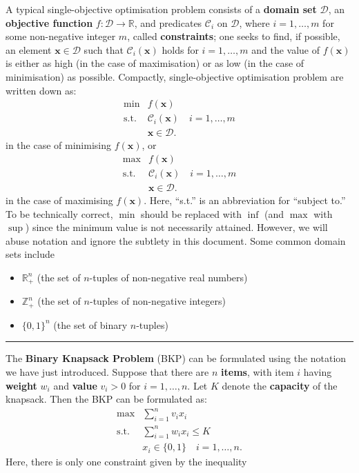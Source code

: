 A typical single-objective optimisation problem consists of a
\textbf{domain set} \(\mathcal{D}\), an \textbf{objective function}
\(f:\mathcal{D} \rightarrow \mathbb{R}\), and predicates
\(\mathcal{C}_i\) on \(\mathcal{D}\), where \(i = 1,\ldots,m\) for some
non-negative integer \(m\), called \textbf{constraints};  one seeks
to find, if possible, an element \(\mathbf{x} \in \mathcal{D}\) such
that \(\mathcal{C}_i(\mathbf{x})\) holds for \(i = 1,\ldots,m\) and the
value of \(f(\mathbf{x})\) is either as high (in the case of
maximisation) or as low (in the case of minimisation) as possible.
\newl Compactly, single-objective optimisation problem are written down as:
\[\begin{array}{rl}
\min & f(\mathbf{x}) \\
\mbox{s.t.}
 & \mathcal{C}_i(\mathbf{x}) \quad i = 1,\ldots,m \\
 & \mathbf{x} \in \mathcal{D}.
\end{array}\] in the case of minimising \(f(\mathbf{x})\), or
\[\begin{array}{rl}
\max & f(\mathbf{x}) \\
\mbox{s.t.}
 & \mathcal{C}_i(\mathbf{x}) \quad i = 1,\ldots,m \\
 & \mathbf{x} \in \mathcal{D}.
\end{array}\] in the case of maximising \(f(\mathbf{x})\). Here,
``s.t.'' is an abbreviation for ``subject to.''
\newl To be technically correct, \(\min\) should be replaced with \(\inf\)
(and \(\max\) with \(\sup\)) since the minimum value is not necessarily
attained. However, we will abuse notation and ignore the subtlety in
this document.
\newl Some common domain sets include
\begin{itemize}[noitemsep]
\item
  \(\mathbb{R}^n_+\) (the set of \(n\)-tuples of non-negative real
  numbers)
\item
  \(\mathbb{Z}^n_+\) (the set of \(n\)-tuples of non-negative integers)
\item
  \(\{0,1\}^n\) (the set of binary \(n\)-tuples)
\end{itemize}
\begin{center}\rule{0.5\linewidth}{.4pt}\end{center}
The \textbf{Binary Knapsack Problem} (BKP) can be formulated using the notation
we have just introduced. Suppose that there are \(n\) \textbf{items}, with item
\(i\) having \textbf{weight} \(w_i\) and \textbf{value} \(v_i > 0\) for \(i = 1,\ldots, n\). 
Let \(K\) denote the \textbf{capacity} of the knapsack. \newpage\noindent Then the BKP can be formulated as: \[\begin{array}{rl}
\max & \sum\limits_{i = 1}^n v_i x_i \\
\mbox{s.t.} & \sum\limits_{i = 1}^n w_i x_i \leq K \\
 & x_i \in \{0,1\} \quad i = 1,\ldots, n.
\end{array}\] Here, there is only one constraint given by the inequality
